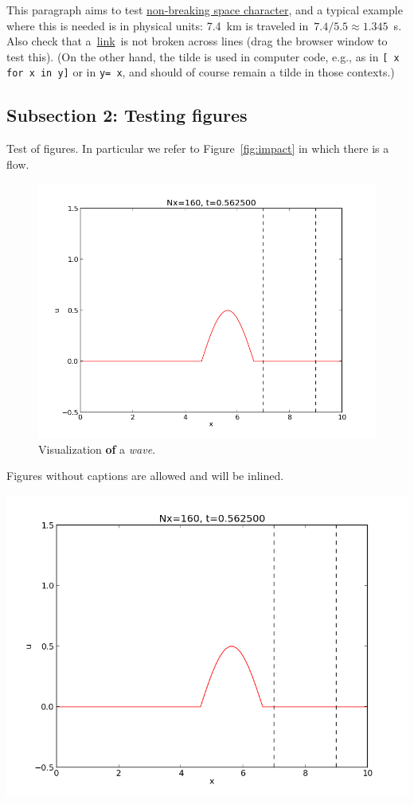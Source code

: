 \documentclass[%
oneside,                 %
final,                   %
10pt]{article}
\newenvironment{notice_mdfboxadmon}[1][]{
\begin{notice_mdfboxmdframed}[frametitle=#1]
}
{
\end{notice_mdfboxmdframed}
}
\theoremstyle{definition}
\begin{document}
\begin{enumerate}
\begin{notice_mdfboxadmon}
This paragraph aims to test \href{{https://en.wikipedia.org/wiki/Non-breaking_space}}{non-breaking space character}, and a typical
example where this is needed is in physical units: 7.4~km is traveled
in~$7.4/5.5\approx 1.345$~s.  Also check that a~\href{{https://google.com}}{link}~is
not broken across lines (drag the browser window to test this).
(On the other hand, the tilde is used in
computer code, e.g., as in \texttt{[~x for x in y]} or in \texttt{y=~x}, and should
of course remain a tilde in those contexts.)
\end{notice_mdfboxadmon} %


\subsection{Subsection 2: Testing figures}
\label{subsec:ex}
Test of figures. In particular we refer to Figure~\vref{fig:impact} in which
there is a flow.
\begin{figure}[!ht]  %
  \centerline{\includegraphics[width=0.9\linewidth]{testfigs/wave1D.png}}
  \caption{
  Visualization \textbf{of} a \emph{wave}. \label{fig:impact}
  }
\end{figure}
Figures without captions are allowed and will be inlined.
\vspace{6mm}
\centerline{\includegraphics[width=0.9\linewidth]{testfigs/wave1D.png}}

\end{enumerate}
\end{document}
